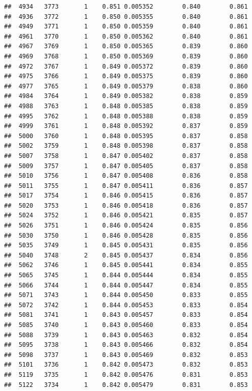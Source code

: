\documentclass[
]{book}
\begin{document}
\begin{verbatim}
##  4934   3773       1    0.851 0.005352        0.840        0.861
##  4936   3772       1    0.850 0.005355        0.840        0.861
##  4949   3771       1    0.850 0.005359        0.840        0.861
##  4961   3770       1    0.850 0.005362        0.840        0.861
##  4967   3769       1    0.850 0.005365        0.839        0.860
##  4969   3768       1    0.850 0.005369        0.839        0.860
##  4972   3767       1    0.849 0.005372        0.839        0.860
##  4975   3766       1    0.849 0.005375        0.839        0.860
##  4977   3765       1    0.849 0.005379        0.838        0.860
##  4984   3764       1    0.849 0.005382        0.838        0.859
##  4988   3763       1    0.848 0.005385        0.838        0.859
##  4995   3762       1    0.848 0.005388        0.838        0.859
##  4999   3761       1    0.848 0.005392        0.837        0.859
##  5000   3760       1    0.848 0.005395        0.837        0.858
##  5002   3759       1    0.848 0.005398        0.837        0.858
##  5007   3758       1    0.847 0.005402        0.837        0.858
##  5009   3757       1    0.847 0.005405        0.837        0.858
##  5010   3756       1    0.847 0.005408        0.836        0.858
##  5011   3755       1    0.847 0.005411        0.836        0.857
##  5017   3754       1    0.846 0.005415        0.836        0.857
##  5020   3753       1    0.846 0.005418        0.836        0.857
##  5024   3752       1    0.846 0.005421        0.835        0.857
##  5026   3751       1    0.846 0.005424        0.835        0.856
##  5030   3750       1    0.846 0.005428        0.835        0.856
##  5035   3749       1    0.845 0.005431        0.835        0.856
##  5040   3748       2    0.845 0.005437        0.834        0.856
##  5062   3746       1    0.845 0.005441        0.834        0.855
##  5065   3745       1    0.844 0.005444        0.834        0.855
##  5066   3744       1    0.844 0.005447        0.834        0.855
##  5071   3743       1    0.844 0.005450        0.833        0.855
##  5072   3742       1    0.844 0.005453        0.833        0.854
##  5081   3741       1    0.843 0.005457        0.833        0.854
##  5085   3740       1    0.843 0.005460        0.833        0.854
##  5088   3739       1    0.843 0.005463        0.832        0.854
##  5095   3738       1    0.843 0.005466        0.832        0.854
##  5098   3737       1    0.843 0.005469        0.832        0.853
##  5101   3736       1    0.842 0.005473        0.832        0.853
##  5119   3735       1    0.842 0.005476        0.831        0.853
##  5122   3734       1    0.842 0.005479        0.831        0.853

\end{verbatim}
\end{document}
